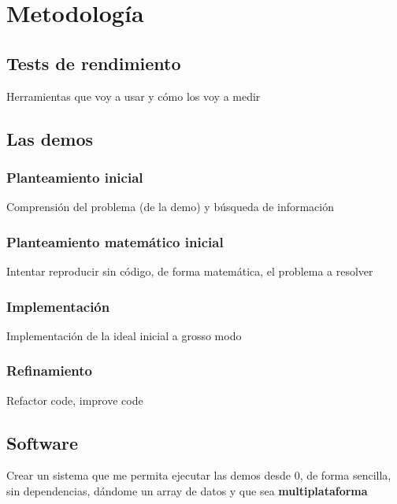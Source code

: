 
\chapter{Metodología}

\section{Tests de rendimiento}

Herramientas que voy a usar y cómo los voy a medir

\section{Las demos}

\subsection{Planteamiento inicial}
Comprensión del problema (de la demo) y búsqueda de información

\subsection{Planteamiento matemático inicial}
Intentar reproducir sin código, de forma matemática, el problema a resolver

\subsection{Implementación}
Implementación de la ideal inicial a grosso modo

\subsection{Refinamiento}
Refactor code, improve code

\section{Software}
Crear un sistema que me permita ejecutar las demos desde 0, de forma sencilla, sin dependencias, dándome un array de datos y que sea \textbf{multiplataforma}
